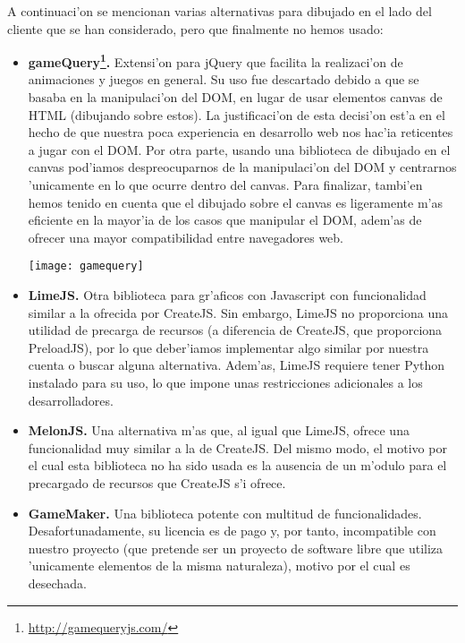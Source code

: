 A continuaci'on se mencionan varias alternativas para dibujado en el lado del cliente que se han
considerado, pero que finalmente no hemos usado:

\begin{itemize}
\item \textbf{gameQuery\footnote{\url{http://gamequeryjs.com/}}.} Extensi'on para jQuery que facilita la realizaci'on 
de animaciones y juegos en general. Su uso fue descartado debido a que se basaba en la manipulaci'on
del DOM, en lugar de usar elementos canvas de HTML (dibujando sobre estos). 
La justificaci'on de esta decisi'on est'a en el hecho de que nuestra poca experiencia en
desarrollo web nos hac'ia reticentes a jugar con el DOM. Por otra parte, usando una biblioteca
de dibujado en el canvas pod'iamos despreocuparnos de  la manipulaci'on del DOM y centrarnos
'unicamente en lo que ocurre dentro del canvas.
Para finalizar, tambi'en hemos tenido en cuenta que el dibujado sobre el canvas es ligeramente
m'as eficiente en la mayor'ia de los casos que manipular el DOM, adem'as de ofrecer una mayor
compatibilidad entre navegadores web.

\begin{center}
\texttt{[image: gamequery]}
\end{center}

\item \textbf{LimeJS.} Otra biblioteca para gr'aficos con Javascript con funcionalidad similar a la 
ofrecida por CreateJS. Sin embargo, LimeJS no proporciona una utilidad de precarga de recursos 
(a diferencia de CreateJS, que proporciona PreloadJS), por lo que deber'iamos implementar algo
similar por nuestra cuenta o buscar alguna alternativa. Adem'as, LimeJS requiere tener Python
instalado para su uso, lo que impone unas restricciones adicionales a los desarrolladores.
\item \textbf{MelonJS.} Una alternativa m'as que, al igual que LimeJS, ofrece una funcionalidad muy similar
a la de CreateJS. Del mismo modo, el motivo por el cual esta biblioteca no ha sido usada es la 
ausencia de un m'odulo para el precargado de recursos que CreateJS s'i ofrece.
\item \textbf{GameMaker.} Una biblioteca potente con multitud de funcionalidades. Desafortunadamente, su
licencia es de pago y, por tanto, incompatible con nuestro proyecto (que pretende ser un proyecto
de software libre que utiliza 'unicamente elementos de la misma naturaleza), motivo por el cual 
es desechada.
\end{itemize}

